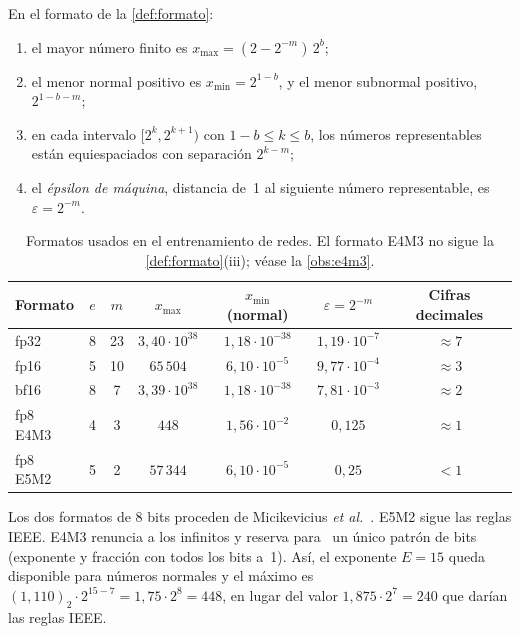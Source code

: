 \begin{proposicion}\label{prop:rango}
En el formato de la \cref{def:formato}:
\begin{enumerate}
  \item el mayor número finito es $x_{\max}=(2-2^{-m})\,2^{b}$;
  \item el menor normal positivo es $x_{\min}=2^{1-b}$, y el menor subnormal positivo, $2^{1-b-m}$;
  \item en cada intervalo $[2^{k},2^{k+1})$ con $1-b\le k\le b$, los números representables están equiespaciados con separación $2^{k-m}$;
  \item el \emph{épsilon de máquina}, distancia de~1 al siguiente número representable, es $\varepsilon=2^{-m}$.
\end{enumerate}
\end{proposicion}

\begin{table}[h]
\centering\small
\begin{tabular}{@{}lcccccc@{}}
\toprule
Formato & $e$ & $m$ & $x_{\max}$ & $x_{\min}$ (normal) & $\varepsilon=2^{-m}$ & Cifras decimales \\
\midrule
fp32 & 8 & 23 & $3{,}40\cdot 10^{38}$ & $1{,}18\cdot 10^{-38}$ & $1{,}19\cdot 10^{-7}$ & $\approx 7$ \\
fp16 & 5 & 10 & $65\,504$ & $6{,}10\cdot 10^{-5}$ & $9{,}77\cdot 10^{-4}$ & $\approx 3$ \\
bf16 & 8 & 7 & $3{,}39\cdot 10^{38}$ & $1{,}18\cdot 10^{-38}$ & $7{,}81\cdot 10^{-3}$ & $\approx 2$ \\
fp8 E4M3 & 4 & 3 & $448$ & $1{,}56\cdot 10^{-2}$ & $0{,}125$ & $\approx 1$ \\
fp8 E5M2 & 5 & 2 & $57\,344$ & $6{,}10\cdot 10^{-5}$ & $0{,}25$ & $<1$ \\
\bottomrule
\end{tabular}
\caption{Formatos usados en el entrenamiento de redes. El formato E4M3 no sigue la \cref{def:formato}(iii); véase la \cref{obs:e4m3}.}
\label{tab:formatos}
\end{table}

\addtocounter{definicion}{1}%

\begin{observacion}[El formato E4M3]\label{obs:e4m3}
Los dos formatos de 8 bits proceden de Micikevicius \emph{et al.}~\cite{fp8}. E5M2 sigue las reglas IEEE. E4M3 renuncia a los infinitos y reserva para \NaN\ un único patrón de bits (exponente y fracción con todos los bits a~1). Así, el exponente $E=15$ queda disponible para números normales y el máximo es $(1{,}110)_2\cdot 2^{15-7}=1{,}75\cdot 2^{8}=448$, en lugar del valor $1{,}875\cdot 2^{7}=240$ que darían las reglas IEEE.
\end{observacion}

